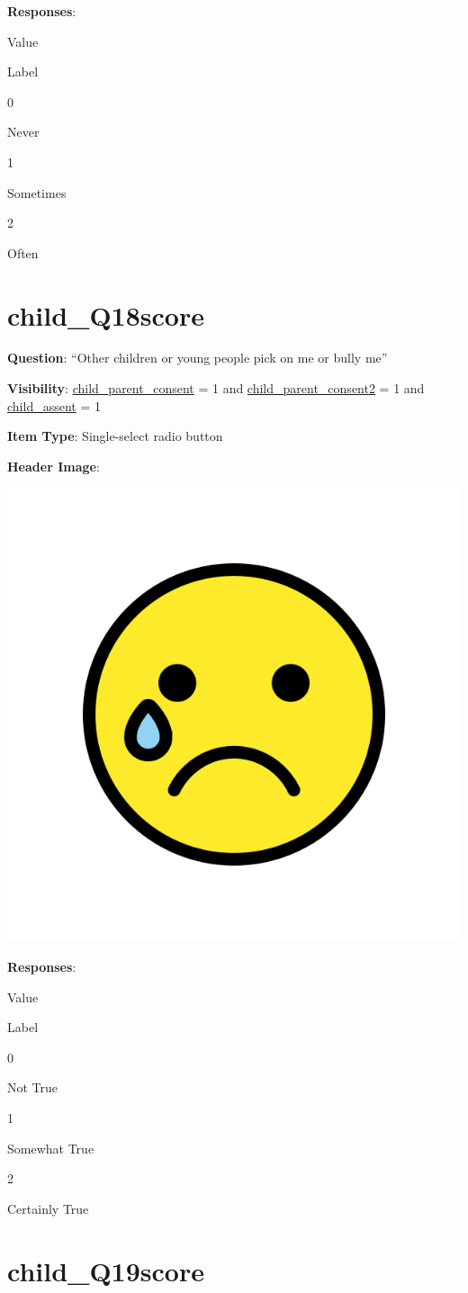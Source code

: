 \documentclass[]{book}
\begin{document}
\textbf{Responses}:

Value

Label

0

Never

1

Sometimes

2

Often

\hypertarget{child_q18score}{%
\section{child\_Q18score}\label{child_q18score}}

\textbf{Question}: ``Other children or young people pick on me or bully me''

\textbf{Visibility}: \protect\hyperlink{child_parent_consent}{child\_parent\_consent} = 1 and \protect\hyperlink{child_parent_consent2}{child\_parent\_consent2} = 1 and \protect\hyperlink{child_assent}{child\_assent} = 1

\textbf{Item Type}: Single-select radio button

\textbf{Header Image}:

\begin{flushleft}\includegraphics[width=0.33\linewidth]{downloadFigs4latex_HBN_PMHS_Codebook/child_Q18score_headerImg} \end{flushleft}

\textbf{Responses}:

Value

Label

0

Not True

1

Somewhat True

2

Certainly True

\hypertarget{child_q19score}{%
\section{child\_Q19score}\label{child_q19score}}
\end{document}
